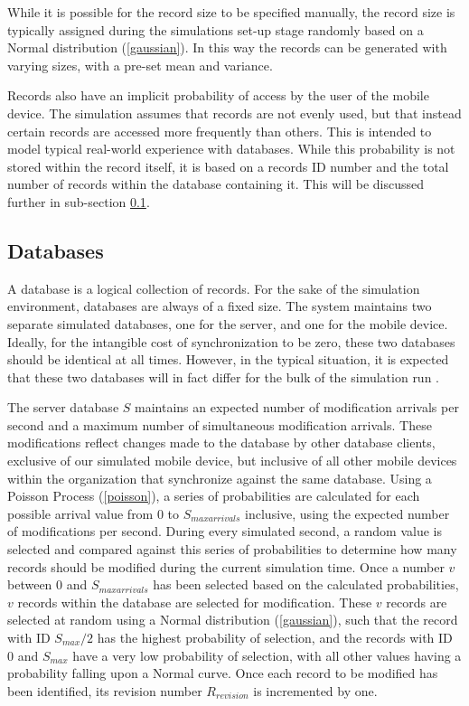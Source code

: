 While it is possible for the record size to be specified manually, the record size is typically assigned during the simulations set-up stage randomly based on a Normal distribution (\ref{gaussian}).  In this way the records can be generated with varying sizes, with a pre-set mean and variance.

Records also have an implicit probability of access by the user of the mobile device.  The simulation assumes that records are not evenly used, but that instead certain records are accessed more frequently than others.  This is intended to model typical real-world experience with databases.  While this probability is not stored within the record itself, it is based on a records ID number and the total number of records within the database containing it.  This will be discussed further in sub-section \ref{databases}.

\subsection{Databases}\label{databases}

A database is a logical collection of records.  For the sake of the simulation environment, databases are always of a fixed size.  The system maintains two separate simulated databases, one for the server, and one for the mobile device.  Ideally, for the intangible cost of synchronization to be zero, these two databases should be identical at all times.  However, in the typical situation, it is expected that these two databases will in fact differ for the bulk of the simulation run \cite{1704823}.

The server database $S$ maintains an expected number of modification arrivals per second and a maximum number of simultaneous modification arrivals.  These modifications reflect changes made to the database by other database clients, exclusive of our simulated mobile device, but inclusive of all other mobile devices within the organization that synchronize against the same database.  Using a Poisson Process (\ref{poisson}), a series of probabilities are calculated for each possible arrival value from $0$ to $S_{max arrivals}$ inclusive, using the expected number of modifications per second.  During every simulated second, a random value is selected and compared against this series of probabilities to determine how many records should be modified during the current simulation time.  Once a number $v$ between $0$ and $S_{max arrivals}$ has been selected based on the calculated probabilities, $v$ records within the database are selected for modification.  These $v$ records are selected at random using a Normal distribution (\ref{gaussian}), such that the record with ID $S_{max}/2$ has the highest probability of selection, and the records with ID $0$ and $S_{max}$ have a very low probability of selection, with all other values having a probability falling upon a Normal curve.  Once each record to be modified has been identified, its revision number $R_{revision}$ is incremented by one.

